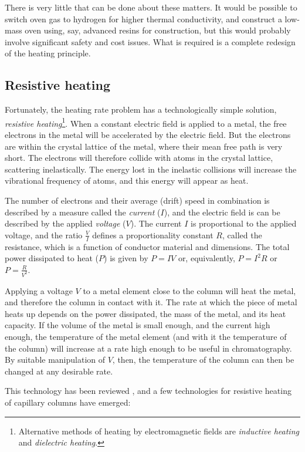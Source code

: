 There is very little that can be done about these matters. It would be possible
to switch oven gas to hydrogen for higher thermal conductivity, and construct a
low-mass oven using, say, advanced resins for construction, but this would
probably involve significant safety and cost issues. What is required is a
complete redesign of the heating principle.

\subsection{Resistive heating}

Fortunately, the heating rate problem has a technologically simple solution,
\textit{resistive heating}\footnote{Alternative methods of heating by
electromagnetic fields are \textit{inductive heating} and \textit{dielectric
heating}.}. When a constant electric field is applied to a metal, the free electrons in
the metal will be accelerated by the electric field. But the electrons are
within the crystal lattice of the metal, where their mean free path is very
short. The electrons will therefore collide with atoms in the crystal lattice,
scattering inelastically. The energy lost in the inelastic collisions will
increase the vibrational frequency of atoms, and this energy will appear as
heat.

The number of electrons and their average (drift) speed in combination is
described by a measure called the \textit{current} ($I$), and the electric field
is can be described by the applied \textit{voltage} ($V$). The current $I$ is
proportional to the applied voltage, and the ratio $\frac{V}{I}$ defines a
proportionality constant $R$, called the resistance, which is a function of
conductor material and dimensions. The total power dissipated to heat ($P$) is
given by $P=IV$ or, equivalently, $P=I^2R$ or $P=\frac{R}{V^2}$.

Applying a voltage \(V\) to a metal element close to the column will heat the
metal, and therefore the column in contact with it. The rate at which the piece
of metal heats up depends on the power dissipated, the mass of the metal, and
its heat capacity. If the volume of the metal is small enough, and the current
high enough, the temperature of the metal element (and with it the temperature
of the column) will increase at a rate high enough to be useful in
chromatography. By suitable manipulation of \(V\), then, the temperature of the
column can then be changed at any desirable rate.

This technology has been reviewed \autocite{Wang2012, Jacobs2013, Miranda2010},
and a few technologies for resistive heating of capillary columns have emerged:

